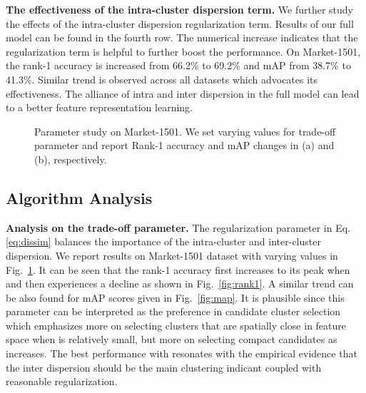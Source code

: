 \documentclass[journal]{IEEEtran}
\begin{document}
\textbf{The effectiveness of the intra-cluster dispersion term.} We further study the effects of the intra-cluster dispersion regularization term. Results of our full model can be found in the fourth row. The numerical increase indicates that the regularization term is helpful to further boost the performance. On Market-1501, the rank-1 accuracy is increased from 66.2\% to 69.2\% and mAP from 38.7\% to 41.3\%. Similar trend is observed across all datasets which advocates its effectiveness. The alliance of intra and inter dispersion in the full model can lead to a better feature representation learning.



\begin{figure}[htb]
\centering
{}
\quad
{}
\caption{Parameter study on Market-1501. We set varying values for trade-off parameter  and report Rank-1 accuracy and mAP changes in (a) and (b), respectively. }
\label{fig:lambda}
\end{figure}
 \subsection{Algorithm Analysis}

\textbf{Analysis on the trade-off parameter.}
The regularization parameter  in Eq. \eqref{eq:dissim} balances  the importance of the intra-cluster and inter-cluster dispersion. We report results on Market-1501 dataset with varying  values in Fig.~\ref{fig:lambda}. It can be seen that the rank-1 accuracy first increases to its peak when  and then experiences a decline as shown in Fig.~\ref{fig:rank1}. A similar trend can be also found for mAP scores given in Fig.~\ref{fig:map}. It is plausible since this parameter can be interpreted as the preference in candidate cluster selection which emphasizes more on selecting clusters that are spatially close in feature space when  is relatively small, but more on selecting compact candidates as  increases. The best performance with  resonates with the empirical evidence that the inter dispersion should be the main clustering indicant coupled with reasonable regularization.
\end{document}

